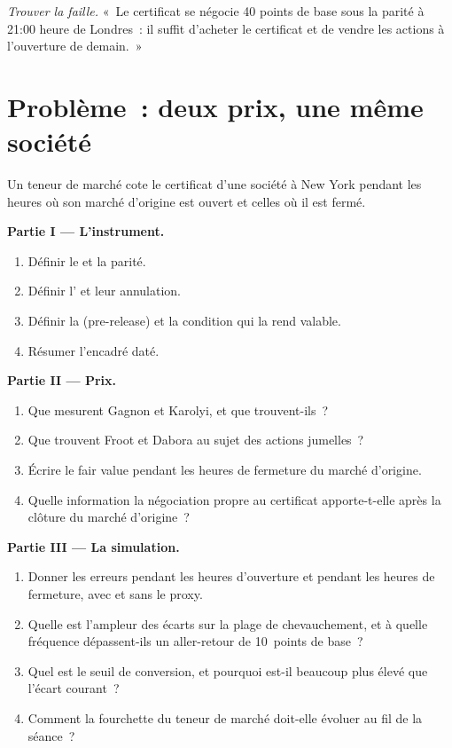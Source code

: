 \begin{exercise}[$\star\star\star$]\label{exo:hf:depositary-receipts-and-dual-listings:8}
\emph{Trouver la faille.} «~Le certificat se négocie 40 points de base sous la parité à 21:00 heure de Londres~: il suffit d'acheter le certificat et de vendre les actions à l'ouverture de demain.~»
\end{exercise}

\section{Problème~: deux prix, une même société}

\begin{problem}\label{pb:hf:depositary-receipts-and-dual-listings:1}
Un teneur de marché cote le certificat d'une société à New York pendant les heures où son marché d'origine est ouvert et celles où il est fermé.

\medskip\noindent\textbf{Partie I --- L'instrument.}
\begin{enumerate}
\item Définir le  et la parité.
\item Définir l' et leur annulation.
\item Définir la  (pre-release) et la condition qui la rend valable.
\item Résumer l'encadré daté.
\end{enumerate}

\medskip\noindent\textbf{Partie II --- Prix.}
\begin{enumerate}[resume]
\item Que mesurent Gagnon et Karolyi, et que trouvent-ils~?
\item Que trouvent Froot et Dabora au sujet des actions jumelles~?
\item Écrire le fair value pendant les heures de fermeture du marché d'origine.
\item Quelle information la négociation propre au certificat apporte-t-elle après la clôture du marché d'origine~?
\end{enumerate}

\medskip\noindent\textbf{Partie III --- La simulation.}
\begin{enumerate}[resume]
\item Donner les erreurs pendant les heures d'ouverture et pendant les heures de fermeture, avec et sans le proxy.
\item Quelle est l'ampleur des écarts sur la plage de chevauchement, et à quelle fréquence dépassent-ils un aller-retour de 10~points de base~?
\item Quel est le seuil de conversion, et pourquoi est-il beaucoup plus élevé que l'écart courant~?
\item Comment la fourchette du teneur de marché doit-elle évoluer au fil de la séance~?
\end{enumerate}


\end{problem}
